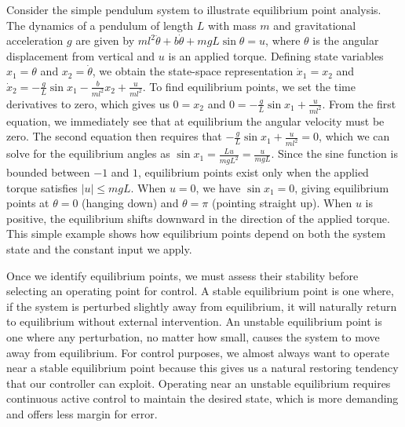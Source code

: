 Consider the simple pendulum system to illustrate equilibrium point analysis. The dynamics of a pendulum of length $L$ with mass $m$ and gravitational acceleration $g$ are given by $ml^2\ddot{\theta} + b\dot{\theta} + mgL\sin\theta = u$, where $\theta$ is the angular displacement from vertical and $u$ is an applied torque. Defining state variables $x_1 = \theta$ and $x_2 = \dot{\theta}$, we obtain the state-space representation $\dot{x}_1 = x_2$ and $\dot{x}_2 = -\frac{g}{L}\sin x_1 - \frac{b}{ml^2}x_2 + \frac{u}{ml^2}$. To find equilibrium points, we set the time derivatives to zero, which gives us $0 = x_2$ and $0 = -\frac{g}{L}\sin x_1 + \frac{u}{ml^2}$. From the first equation, we immediately see that at equilibrium the angular velocity must be zero. The second equation then requires that $-\frac{g}{L}\sin x_1 + \frac{u}{ml^2} = 0$, which we can solve for the equilibrium angles as $\sin x_1 = \frac{Lu}{mgL^2} = \frac{u}{mgL}$. Since the sine function is bounded between $-1$ and $1$, equilibrium points exist only when the applied torque satisfies $|u| \leq mgL$. When $u = 0$, we have $\sin x_1 = 0$, giving equilibrium points at $\theta = 0$ (hanging down) and $\theta = \pi$ (pointing straight up). When $u$ is positive, the equilibrium shifts downward in the direction of the applied torque. This simple example shows how equilibrium points depend on both the system state and the constant input we apply.

Once we identify equilibrium points, we must assess their stability before selecting an operating point for control. A stable equilibrium point is one where, if the system is perturbed slightly away from equilibrium, it will naturally return to equilibrium without external intervention. An unstable equilibrium point is one where any perturbation, no matter how small, causes the system to move away from equilibrium. For control purposes, we almost always want to operate near a stable equilibrium point because this gives us a natural restoring tendency that our controller can exploit. Operating near an unstable equilibrium requires continuous active control to maintain the desired state, which is more demanding and offers less margin for error.

